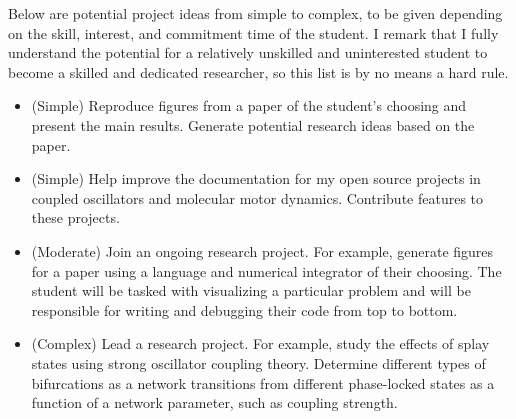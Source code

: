 \documentclass[a4paper,11pt]{article}
\begin{document}
Below are potential project ideas from simple to complex, to be given depending on the skill, interest, and commitment time of the student. I remark that I fully understand the potential for a relatively unskilled and uninterested student to become a skilled and dedicated researcher, so this list is by no means a hard rule.

\begin{itemize}
	\item (Simple) Reproduce figures from a paper of the student's choosing and present the main results. Generate potential research ideas based on the paper.
	\item (Simple) Help improve the documentation for my open source projects in coupled oscillators and molecular motor dynamics. Contribute features to these projects.
	\item (Moderate) Join an ongoing research project. For example, generate figures for a paper using a language and numerical integrator of their choosing. The student will be tasked with visualizing a particular problem and will be responsible for writing and debugging their code from top to bottom.
	\item (Complex) Lead a research project. For example, study the effects of splay states using strong oscillator coupling theory. Determine different types of bifurcations as a network transitions from different phase-locked states as a function of a network parameter, such as coupling strength.
\end{itemize}

\end{document}
